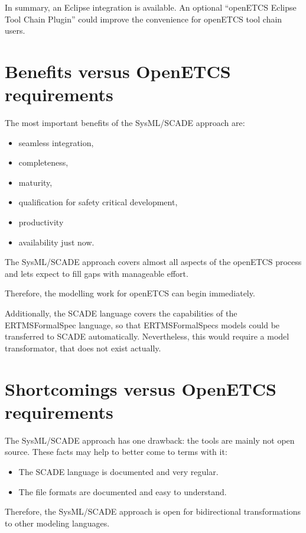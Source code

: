 In summary, an Eclipse integration is available. An optional "`openETCS Eclipse Tool Chain Plugin"' could improve the convenience for openETCS tool chain users. 


\section{Benefits versus OpenETCS requirements}

The most important benefits of the SysML/SCADE approach are: 

\begin{itemize}
	\item seamless integration,
	\item completeness,
	\item maturity,
	\item qualification for safety critical development,
	\item productivity
	\item availability just now.
\end{itemize}
 
The SysML/SCADE approach covers almost all aspects of the openETCS process and lets expect to fill gaps with manageable effort.

Therefore, the modelling work for openETCS can begin immediately. 

Additionally, the SCADE language covers the capabilities of the ERTMSFormalSpec language, so that ERTMSFormalSpecs models could be transferred to SCADE automatically. Nevertheless, this would require a model transformator, that does not exist actually.   


\section{Shortcomings versus OpenETCS requirements}

The SysML/SCADE approach has one drawback: the tools are mainly not open source. 
These facts may help to better come to terms with it:

\begin{itemize}
	\item The SCADE language is documented and very regular. 
	\item The file formats are documented and easy to understand. 
\end{itemize}

Therefore, the SysML/SCADE approach is open for bidirectional transformations to other modeling languages. 


